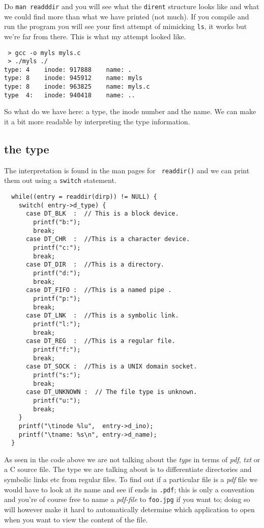\documentclass[a4paper,11pt]{article}
\begin{document}
Do {\tt man readddir} and you will see what the {\tt dirent} structure
looks like and what we could find more than what we have printed (not
much). If you compile and run the program you will see your first
attempt of mimicking {\tt ls}, it works but we're far from there. This
is what my attempt looked like.

\begin{verbatim}
 > gcc -o myls myls.c
 > ./myls ./
type: 4    inode: 917888	name: .
type: 8    inode: 945912	name: myls
type: 8    inode: 963825	name: myls.c
type  4:   inode: 940418	name: ..
\end{verbatim}

So what do we have here: a type, the inode number and the
name. We can make it a bit more readable by interpreting the type
information. 

\subsection{the type}

The interpretation is found in the man pages for {\tt
  readdir()} and we can print them out using a {\tt switch} statement. 

\begin{lstlisting}
  while((entry = readdir(dirp)) != NULL) {
    switch( entry->d_type) {
      case DT_BLK  :  // This is a block device. 
        printf("b:");
        break;      
      case DT_CHR  :  //This is a character device.
        printf("c:");
        break;      
      case DT_DIR  :  //This is a directory.
        printf("d:");
        break;
      case DT_FIFO :  //This is a named pipe .
        printf("p:");
        break;
      case DT_LNK  :  //This is a symbolic link.
        printf("l:");
        break;
      case DT_REG  :  //This is a regular file.
        printf("f:");
        break;
      case DT_SOCK :  //This is a UNIX domain socket.
        printf("s:");
        break;
      case DT_UNKNOWN :  // The file type is unknown.
        printf("u:");
        break;
    }
    printf("\tinode %lu",  entry->d_ino);
    printf("\tname: %s\n", entry->d_name);
  }
\end{lstlisting}

As seen in the code above we are not talking about the {\em type} in
terms of {\em pdf}, {\em txt} or a C source file. The type we are
talking about is to differentiate directories and symbolic links etc from
regular files. To find out if a particular file is a {\em pdf} file we
would have to look at its name and see if ends in {\tt .pdf}; this is
only a convention and you're of course free to name a {\em pdf-file}
to {\tt foo.jpg} if you want to; doing so will however make it hard to
automatically determine which application to open when you want to
view the content of the file.
\end{document}
